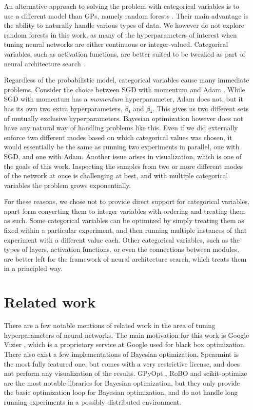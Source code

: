 An alternative approach to solving the problem with categorical variables is to
use a different model than GPs, namely random forests
\citep{nando-bayesian-out-of-the-loop}. Their main advantage is the ability to
naturally handle various types of data. We however do not explore random
forests in this work, as many of the hyperparameters of interest when tuning
neural networks are either continuous or integer-valued. Categorical variables,
such as activation functions, are better suited to be tweaked as part of neural
architecture search \citep{nasnet}.

Regardless of the probabilistic model, categorical variables cause many
immediate problems.  Consider the choice between SGD with momentum
\citep{overview-of-sgd} and Adam \citep{kingma2014adam}.  While SGD with
momentum has a \emph{momentum} hyperparameter, Adam does not, but it has its
own two extra hyperparameters, $β₁$ and $β₂$. This gives us two different sets
of mutually exclusive hyperparameters. Bayesian optimization however does not
have any natural way of handling problems like this. Even if we did externally
enforce two different modes based on which categorical values was chosen, it
would essentially be the same as running two experiments in parallel, one with
SGD, and one with Adam. Another issue arises in visualization, which is one of
the goals of this work. Inspecting the samples from two or more different modes
of the network at once is challenging at best, and with multiple categorical
variables the problem grows exponentially.

For these reasons, we chose not to provide direct support for categorical
variables, apart form converting them to integer variables with ordering and
treating them as such. Some categorical variables can be optimized by simply
treating them as fixed within a particular experiment, and then running
multiple instances of that experiment with a different value each. Other
categorical variables, such as the types of layers, activation functions, or
even the connections between modules, are better left for the framework of
neural architecture search, which treats them in a principled way.


\section{Related work}

There are a few notable mentions of related work in the area of tuning
hyperparameters of neural networks. The main motivation for this work is
Google Vizier \citep{google-vizier}, which is a proprietary service at Google
used for black box optimization. There also exist a few implementations of
Bayesian optimization. Spearmint \citep{spearmint} is the most fully featured
one, but comes with a very restrictive license, and does not perform any
visualization of the results. GPyOpt \citep{gpyopt2016}, RoBO \citep{robo} and scikit-optimize
\citep{scikit-optimize} are the most notable libraries for Bayesian
optimization, but they only provide the basic optimization loop for Bayesian
optimization, and do not handle long running experiments in a possibly
distributed environment.

